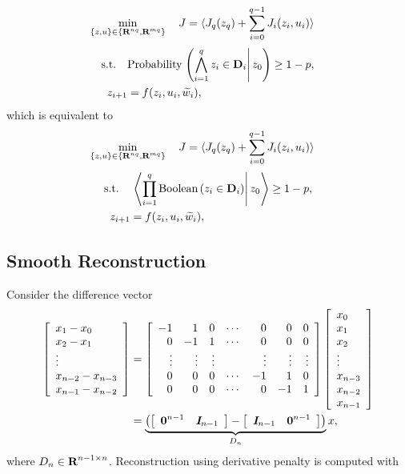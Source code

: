 \documentclass{article}
\begin{document}
    \begin{align*}
        \min_{\{z,u\}\in\{\textbf{R}^{nq},\textbf{R}^{mq}\}}\quad J&=\langle J _q(z_q)+\sum_{i=0}^{q-1}  J _i(z_i,u_i)\rangle
    \end{align*}
    \begin{align*}
        \text{s.t.}\quad &\text{Probability}\left.\left(\bigwedge_{i=1}^{q} z_i\in\textbf{D}_i\right|z_0\right)\geq 1- p,\\
        z_{i+1}&=f(z_i,u_i,\widetilde{w}_i),
    \end{align*}
    which is equivalent to
    \begin{align*}
        \min_{\{z,u\}\in\{\textbf{R}^{nq},\textbf{R}^{mq}\}}\quad J&=\langle J _q(z_q)+\sum_{i=0}^{q-1}  J _i(z_i,u_i)\rangle
    \end{align*}
    \begin{align*}
        \text{s.t.}\quad &\left.\left\langle\prod_{i=1}^{q} \text{Boolean}\left(z_i\in\textbf{D}_i\right)\right | z_0\right\rangle\geq 1-p,\\
        z_{i+1}&=f(z_i,u_i,\widetilde{w}_i),
    \end{align*}

\subsection{Smooth Reconstruction}
    Consider the difference vector
    \begin{align*}
        \left[\begin{array}{lllllllllllllllllll}x_1-x_0\\x_2-x_1\\\vdots\\x_{n-2}-x_{n-3}\\x_{n-1}-x_{n-2}\end{array}\right]
        &=\left[\begin{array}{rrrrrrr}
            -1 & 1 & 0 & \cdots & 0 & 0 & 0\\
            0& -1 & 1 & \cdots & 0 & 0 & 0\\
            \vdots & \vdots & \vdots &  & \vdots & \vdots & \vdots\\
            0 & 0 & 0 & \cdots & -1 & 1 & 0\\
            0 & 0 & 0 & \cdots & 0 & -1 & 1
        \end{array}\right]\left[\begin{array}{lllllllllllllllllll}x_0\\x_1\\x_2\\\vdots\\x_{n-3}\\x_{n-2}\\x_{n-1}\end{array}\right]\\
        &=\underbrace{\left(\left[\begin{array}{lllllllllllllllllll}\textbf{0}^{n-1}&\emph{\textbf{I}}_{n-1}\end{array}\right]-\left[\begin{array}{lllllllllllllllllll}\emph{\textbf{I}}_{n-1} & \textbf{0}^{n-1}\end{array}\right]\right)}_{D_n}x,
    \end{align*}
    where $D_n\in\textbf{R}^{n-1\times n}$.
    Reconstruction using derivative penalty is computed with
    
\end{document}
